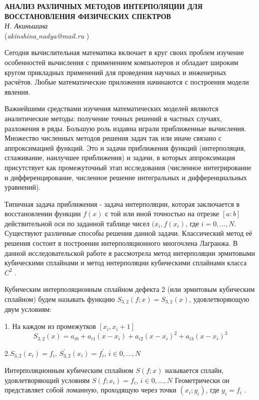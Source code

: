 \begin{center}{ \bf  АНАЛИЗ РАЗЛИЧНЫХ МЕТОДОВ ИНТЕРПОЛЯЦИИ ДЛЯ ВОССТАНОВЛЕНИЯ ФИЗИЧЕСКИХ СПЕКТРОВ}\\
{\it Н. Акиньшина } \\
({\it akinshina$\_$nadya@mail.ru} )
\end{center}

Сегодня вычислительная математика включает в круг своих проблем изучение особенностей вычисления с применением компьютеров и обладает широким кругом прикладных применений для проведения научных и инженерных расчётов. Любые математические приложения начинаются с построения модели явления.

Важнейшими средствами изучения математических моделей являются аналитические методы: получение точных решений в частных случаях, разложения в ряды. Большую роль издавна играли приближенные вычисления. Множество численных методов решения задач так или иначе связано с аппроксимацией функций. Это и задачи приближения функций (интерполяция, сглаживание, наилучшее приближения) и задачи, в которых аппроксимация присутствует как промежуточный этап исследования (численное интегрирование и дифференцирование, численное решение интегральных и дифференциальных уравнений).

Типичная задача приближения - задача интерполяции, которая заключается в восстановлении функции $f(x)$ с той или иной точностью на отрезке $[a:b]$ действительной оси по заданной таблице чисел $(x_i, f(x_i)$, где $i=0,...,N$. Существуют различные способы решения данной задачи. Классический метод её решения состоит в построении интерполяционного многочлена Лагранжа.
В данной исследовательской работе я рассмотрела метод интерполяции эрмитовыми кубическими сплайнами и метод интерполяции кубическими сплайнами класса $C^2$ .

Кубическим интерполяционным сплайном дефекта 2
\linebreak
(или эрмитовым кубическим сплайном) будем называть фу\-н\-к\-цию
$S_{3,2}(f;x)=S_{3,2}(x)$, удовлетворяющую двум условиям:

1. На каждом из промежутков $[x_i,x_i+1]$
$$S_{3,2}(x)=a_{i0}+a_{i1}(x-x_i)+a_{i2}(x-x_i)^2+a_{i3}(x-x_i)^3$$

2.$S_{3,2}(x_i)=f_i$, $S_{3,2}^{'}(x_i)=f_i^{'}$, $i\in 0,...,N$

Интерполяционным кубическим сплайном $S(f;x)$  называется сплайн, удовлетворяющий условиям
 $S(f;x_i)=f_i$, $i\in 0,...,N$
 Геометрически он представляет собой ломанную, проходящую через точки $(x_i;y_i)$, где $y_i=f_i$ .
